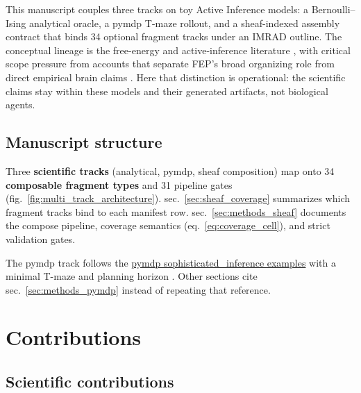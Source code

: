 \documentclass[
  english,
]{article}
\begin{document}
This manuscript couples three tracks on toy Active Inference models: a
Bernoulli--Ising analytical oracle, a pymdp T-maze rollout, and a
sheaf-indexed assembly contract that binds 34 optional fragment tracks
under an IMRAD outline. The conceptual lineage is the free-energy and
active-inference literature
\citep{friston2010fep, buckley2017mathreview, parr2022active}, with
critical scope pressure from accounts that separate FEP's broad
organizing role from direct empirical brain claims
\citep{gershman2019fepbrain}. Here that distinction is operational: the
scientific claims stay within these models and their generated
artifacts, not biological agents.

\subsection{Manuscript structure}\label{manuscript-structure}

Three \textbf{scientific tracks} (analytical, pymdp, sheaf composition)
map onto 34 \textbf{composable fragment types} and 31 pipeline gates
(fig.~\ref{fig:multi_track_architecture}). sec.~\ref{sec:sheaf_coverage}
summarizes which fragment tracks bind to each manifest row.
sec.~\ref{sec:methods_sheaf} documents the compose pipeline, coverage
semantics (eq.~\ref{eq:coverage_cell}), and strict validation gates.

The pymdp track follows the
\href{https://github.com/infer-actively/pymdp/tree/main/examples/experimental/sophisticated_inference}{pymdp
sophisticated\_inference examples} \citep{pymdp2024} with a minimal
T-maze and planning horizon . Other sections
cite sec.~\ref{sec:methods_pymdp} instead of repeating that reference.

\newpage

\section{Contributions}\label{sec:intro_contributions}

\subsection{Scientific contributions}\label{scientific-contributions}
\end{document}

